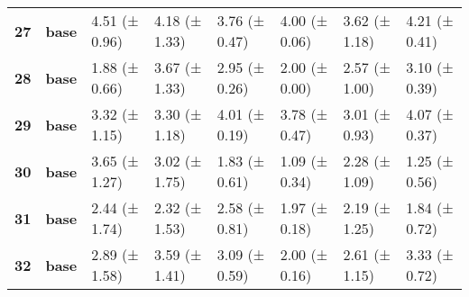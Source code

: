 \begin{longtable}{llllllll}
\cline{1-8}
\textbf{27} & \textbf{base} & 4.51 (± 0.96) & 4.18 (± 1.33) & 3.76 (± 0.47) & 4.00 (± 0.06) & 3.62 (± 1.18) & 4.21 (± 0.41) \\
\cline{1-8}
\textbf{28} & \textbf{base} & 1.88 (± 0.66) & 3.67 (± 1.33) & 2.95 (± 0.26) & 2.00 (± 0.00) & 2.57 (± 1.00) & 3.10 (± 0.39) \\
\cline{1-8}
\textbf{29} & \textbf{base} & 3.32 (± 1.15) & 3.30 (± 1.18) & 4.01 (± 0.19) & 3.78 (± 0.47) & 3.01 (± 0.93) & 4.07 (± 0.37) \\
\cline{1-8}
\textbf{30} & \textbf{base} & 3.65 (± 1.27) & 3.02 (± 1.75) & 1.83 (± 0.61) & 1.09 (± 0.34) & 2.28 (± 1.09) & 1.25 (± 0.56) \\
\cline{1-8}
\textbf{31} & \textbf{base} & 2.44 (± 1.74) & 2.32 (± 1.53) & 2.58 (± 0.81) & 1.97 (± 0.18) & 2.19 (± 1.25) & 1.84 (± 0.72) \\
\cline{1-8}
\textbf{32} & \textbf{base} & 2.89 (± 1.58) & 3.59 (± 1.41) & 3.09 (± 0.59) & 2.00 (± 0.16) & 2.61 (± 1.15) & 3.33 (± 0.72) \\
\cline{1-8}
\end{longtable}
